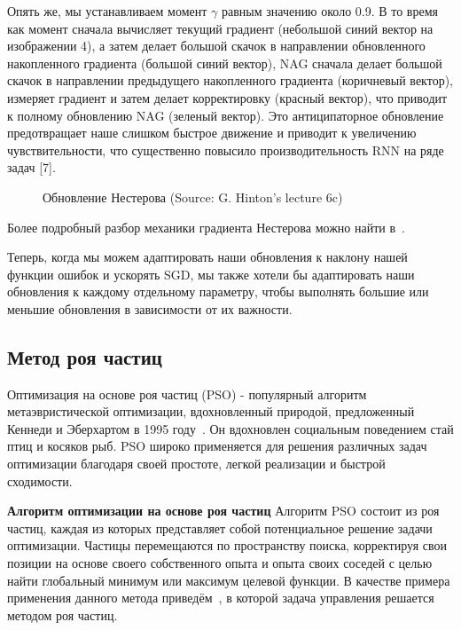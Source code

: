 Опять же, мы устанавливаем момент $\gamma$ равным значению около 0.9.
В то время как момент сначала вычисляет текущий
градиент (небольшой синий вектор на изображении 4),
а затем делает большой скачок в направлении обновленного
накопленного градиента (большой синий вектор), NAG сначала делает
большой скачок в направлении предыдущего накопленного градиента
(коричневый вектор), измеряет градиент и затем делает корректировку
(красный вектор), что приводит к полному обновлению NAG (зеленый вектор).
Это антиципаторное обновление предотвращает
наше слишком быстрое движение и приводит к увеличению чувствительности,
что существенно повысило производительность RNN на ряде задач [7].
\begin{figure}[ht]
    \caption{Обновление Нестерова (Source: G. Hinton's lecture 6c)}\label{fig:4_2:1}
\end{figure}

Более подробный разбор механики градиента Нестерова
можно найти в~\cite{Sutskever2013}.

Теперь, когда мы можем адаптировать наши обновления к наклону
нашей функции ошибок и ускорять SGD, мы также хотели бы адаптировать
наши обновления к каждому отдельному параметру, чтобы выполнять
большие или меньшие обновления в зависимости от их важности.

\subsection{Метод роя частиц}\label{subsec:ch4/sec2/stokhastic}
Оптимизация на основе роя частиц (PSO) - популярный алгоритм метаэвристической
оптимизации, вдохновленный природой, предложенный Кеннеди и Эберхартом
в 1995 году~\cite{kennedy1995}.
Он вдохновлен социальным поведением стай птиц и косяков рыб.
PSO широко применяется для решения различных задач оптимизации благодаря
своей простоте, легкой реализации и быстрой сходимости.


\textbf{Алгоритм оптимизации на основе роя частиц}
Алгоритм PSO состоит из роя частиц, каждая из которых представляет собой
потенциальное решение задачи оптимизации.
Частицы перемещаются по пространству поиска, корректируя свои позиции
на основе своего собственного опыта и опыта своих соседей с целью найти
глобальный минимум или максимум целевой функции.
В качестве примера применения данного метода приведём~\cite{Alekseev2019Simulation},
в которой задача управления решается методом роя частиц.

